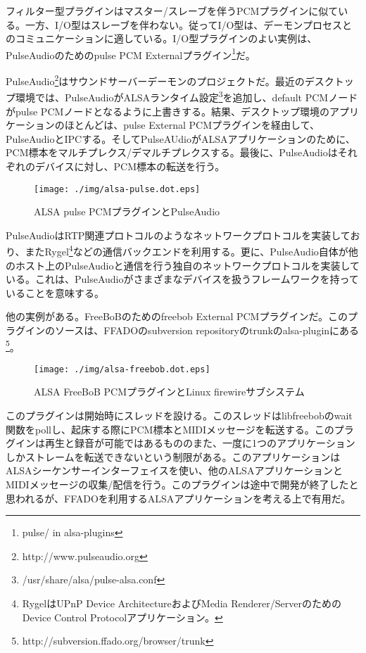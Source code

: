 \documentclass[onecolumn]{jarticle}
\begin{document}
フィルター型プラグインはマスター/スレーブを伴うPCMプラグインに似ている。一方、I/O型はスレーブを伴わない。従ってI/O型は、デーモンプロセスとのコミュニケーションに適している。I/O型プラグインのよい実例は、PulseAudioのためのpulse PCM Externalプラグイン\footnote{pulse/ in alsa-plugins}だ。

PulseAudio\footnote{http://www.pulseaudio.org}はサウンドサーバーデーモンのプロジェクトだ。最近のデスクトップ環境では、PulseAudioがALSAランタイム設定\footnote{/usr/share/alsa/pulse-alsa.conf}を追加し、default PCMノードがpulse PCMノードとなるように上書きする。結果、デスクトップ環境のアプリケーションのほとんどは、pulse External PCMプラグインを経由して、PulseAudioとIPCする。そしてPulseAUdioがALSAアプリケーションのために、PCM標本をマルチプレクス/デマルチプレクスする。最後に、PulseAudioはそれぞれのデバイスに対し、PCM標本の転送を行う。

\begin{figure}[H]
	\centering
	\texttt{[image: ./img/alsa-pulse.dot.eps]}
	\caption{ALSA pulse PCMプラグインとPulseAudio}
	\label{alsa-pulse}
\end{figure}

PulseAudioはRTP関連プロトコルのようなネットワークプロトコルを実装しており、またRygel\footnote{RygelはUPnP Device ArchitectureおよびMedia Renderer/ServerのためのDevice Control Protocolアプリケーション。}などの通信バックエンドを利用する。更に、PulseAudio自体が他のホスト上のPulseAudioと通信を行う独自のネットワークプロトコルを実装している。これは、PulseAudioがさまざまなデバイスを扱うフレームワークを持っていることを意味する。

他の実例がある。FreeBoBのためのfreebob External PCMプラグインだ。このプラグインのソースは、FFADOのsubversion repositoryのtrunkのalsa-pluginにある\footnote{http://subversion.ffado.org/browser/trunk}。

\begin{figure}[H]
	\centering
	\texttt{[image: ./img/alsa-freebob.dot.eps]}
	\caption{{ALSA FreeBoB PCMプラグインとLinux firewireサブシステム}}
	\label{alsa_freebob}
\end{figure}

このプラグインは開始時にスレッドを設ける。このスレッドはlibfreebobのwait関数をpollし、起床する際にPCM標本とMIDIメッセージを転送する。このプラグインは再生と録音が可能ではあるもののまた、一度に1つのアプリケーションしかストレームを転送できないという制限がある。このアプリケーションはALSAシーケンサーインターフェイスを使い、他のALSAアプリケーションとMIDIメッセージの収集/配信を行う。このプラグインは途中で開発が終了したと思われるが、FFADOを利用するALSAアプリケーションを考える上で有用だ。
\end{document}
